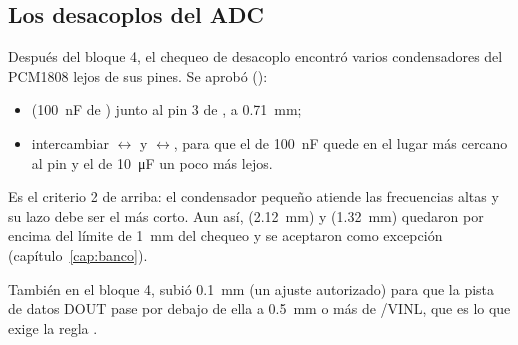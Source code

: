 \subsection{Los desacoplos del ADC}
Después del bloque 4, el chequeo de desacoplo encontró varios condensadores del PCM1808 lejos de sus pines. Se
aprobó ():
\begin{itemize}
  \item {} (\SI{100}{\nano\farad} de ) junto al pin 3 de , a \SI{0.71}{\milli\meter};
  \item intercambiar $\leftrightarrow$ y $\leftrightarrow$, para que el de
        \SI{100}{\nano\farad} quede en el lugar más cercano al pin y el de \SI{10}{\micro\farad} un poco más lejos.
\end{itemize}
Es el criterio 2 de arriba: el condensador pequeño atiende las frecuencias altas y su lazo debe ser el más corto. Aun
así,  (\SI{2.12}{\milli\meter}) y  (\SI{1.32}{\milli\meter}) quedaron por encima del límite de
\SI{1}{\milli\meter} del chequeo y se aceptaron como excepción (capítulo~\ref{cap:banco}).

También en el bloque 4,  subió \SI{0.1}{\milli\meter} (un ajuste autorizado) para que la pista de datos
DOUT pase por debajo de ella a \SI{0.5}{\milli\meter} o más de /VINL, que es lo que exige la regla
.

